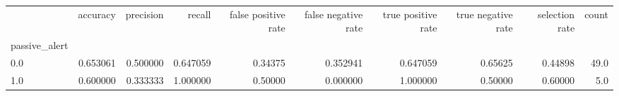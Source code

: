 \begin{tabular}{lrrrrrrrrr}
\toprule
{} &  accuracy &  precision &    recall &  false positive rate &  false negative rate &  true positive rate &  true negative rate &  selection rate &  count \\
passive\_alert &           &            &           &                      &                      &                     &                     &                 &        \\
\midrule
0.0           &  0.653061 &   0.500000 &  0.647059 &              0.34375 &             0.352941 &            0.647059 &             0.65625 &         0.44898 &   49.0 \\
1.0           &  0.600000 &   0.333333 &  1.000000 &              0.50000 &             0.000000 &            1.000000 &             0.50000 &         0.60000 &    5.0 \\
\bottomrule
\end{tabular}
